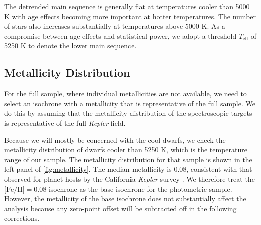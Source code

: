 \documentclass[twocolumn]{aastex6}
\newcommand{\Kepler}{\mbox{\textit{Kepler}}}
\newcommand{\Teff}{\ensuremath{T_{\textrm{eff}}}}
\newcommand{\MK}{\ensuremath{M_{Ks}}}
\newcommand{\feh}{\textrm{[Fe/H]}}
\begin{document}
The detrended main sequence is generally flat at temperatures cooler than 5000 K 
with age effects becoming more important at hotter temperatures. The number of stars
also increases substantially at temperatures above 5000 K. As a compromise
between age effects and statistical power, we adopt a threshold \Teff{} of 
5250 K to denote the lower main sequence.

\subsection{Metallicity Distribution}

For the full \citet{McQuillan14} sample, where individual metallicities are not
available, we need to select an isochrone with a metallicity that is 
representative of the full sample. We do this by assuming that the metallicity 
distribution of the spectroscopic targets is representative of the full 
\Kepler{} field. 

\begin{figure*}[htb]
    \centering
    \caption{\emph{Left:} Metallicity distribution of the \Kepler{} cool 
        dwarfs in the APOGEE sample, selected as having 
        \(\Teff < 5250 \textrm{ K }\) and a luminosity less than 1.3 mag above 
        the single-star sequence. The 
        thick black line denotes the median metallicity while the thin black 
        lines denote the 1-\(\sigma\) confidence intervals. The hatched region
        to the left of \feh{}=-0.5 denotes the metallicity beneath which the 
        empirical correction in \cref{fig:met_trend} is poorly constrained due 
        to too few metal-poor stars. \emph{Right:} The vertical displacement 
        caused by assuming a single metallicity isochrone.  The blue line 
        represents the difference between the derived \MK{} assuming the 
        median field metallicity and that for the true metallicity. The 
        orange line includes our empirical shape correction for metallicity, 
        which removes most of the predicted width. The hatched region
        to the left of \feh{}=-0.5 denotes the metallicity beneath which the 
        empirical correction is poorly constrained due to too few metal-poor 
        stars.}\label{fig:metallicity}
\end{figure*}

Because we will mostly be concerned with the cool dwarfs, we check the
metallicity distribution of dwarfs cooler than 5250 K, which is the 
temperature range of our sample. The metallicity distribution for that
sample is shown in the left panel of \cref{fig:metallicity}. The median metallicity is 
0.08, consistent with that observed for planet hosts by 
the California \Kepler{} survey \citep{Petigura17}.  We therefore treat the
\(\feh{} = 0.08\) isochrone as the base isochrone for the photometric sample. 
However, the metallicity of the base isochrone does not substantially affect 
the analysis because any zero-point offset will be subtracted off in the 
following corrections.
\end{document}

